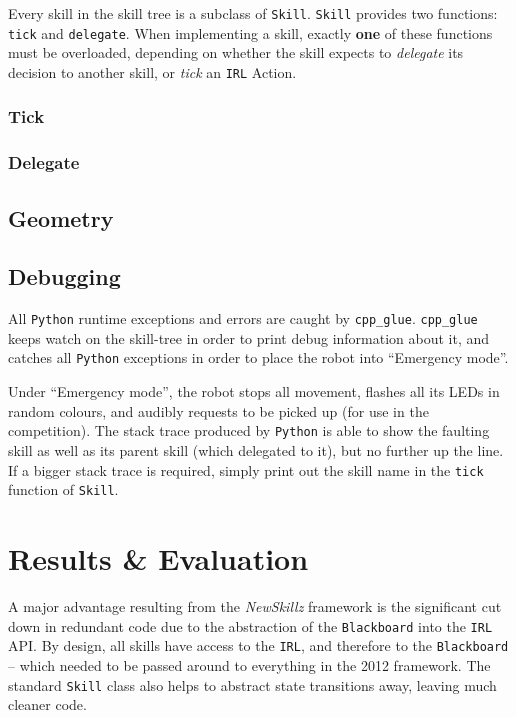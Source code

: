Every skill in the skill tree is a subclass of \texttt{Skill}. \texttt{Skill} provides two functions: \texttt{tick} and \texttt{delegate}. When implementing a skill, exactly \textbf{one} of these functions must be overloaded, depending on whether the skill expects to \textit{delegate} its decision to another skill, or \textit{tick} an \texttt{IRL} Action.

\subsubsection{Tick}

\subsubsection{Delegate}

\subsection{Geometry}

\subsection{Debugging} 

All \verb!Python! runtime exceptions and errors are caught by \texttt{cpp\_glue}. \texttt{cpp\_glue} keeps watch on the skill-tree in order to print debug information about it, and catches all \verb!Python! exceptions in order to place the robot into ``Emergency mode''.

Under ``Emergency mode'', the robot stops all movement, flashes all its LEDs in random colours, and audibly requests to be picked up (for use in the competition). The stack trace produced by \verb!Python! is able to show the faulting skill as well as its parent skill (which delegated to it), but no further up the line. If a bigger stack trace is required, simply print out the skill name in the \texttt{tick} function of \texttt{Skill}.

\section{Results \& Evaluation}

A major advantage resulting from the \textit{NewSkillz} framework is the significant cut down in redundant code due to the abstraction of the \texttt{Blackboard} into the \texttt{IRL} API. By design, all skills have access to the \texttt{IRL}, and therefore to the \texttt{Blackboard} -- which needed to be passed around to everything in the 2012 framework. The standard \texttt{Skill} class also helps to abstract state transitions away, leaving much cleaner code.


